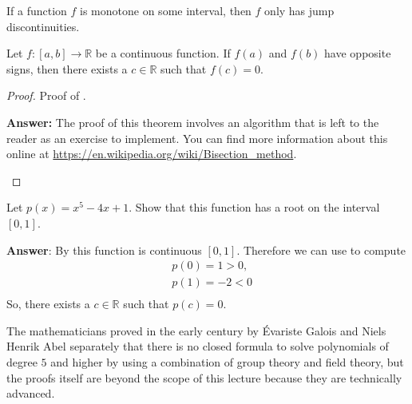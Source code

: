 \begin{thm}\label{thm-monotone-jump-discontinuities}
	If a function $f$ is monotone on some interval, then $f$ only has jump discontinuities.
\end{thm}

\begin{thm}\label{thm-continuous-opposite-signs}
	Let $f:[a,b]\to\mathbb{R}$ be a continuous function. If $f(a)$ and $f(b)$ have
	opposite signs, then there exists a $c\in\mathbb{R}$ such that $f(c)=0$.
\end{thm}

\begin{proof}
	Proof of .
	\begin{flushleft}
		\textbf{Answer:} The proof of this theorem involves an algorithm that is
		left to the reader as an exercise to implement. You can find more information
		about this online at \url{https://en.wikipedia.org/wiki/Bisection_method}.
	\end{flushleft}
\end{proof}

\begin{exm}\label{exm-continuous-opposite-signs:1}
	Let $p(x)=x^5-4x+1$. Show that this function has a root on the interval $[0,1]$.
	\begin{flushleft}
		\textbf{Answer}: By  this
		function is continuous $[0,1]$. Therefore we can use 
		to compute
		\begin{align*}
			 & p(0)=1>0, \\
			 & p(1)=-2<0 \\
		\end{align*}
		So, there exists a $c\in\mathbb{R}$ such that $p(c)=0$.
	\end{flushleft}
\end{exm}

\begin{rem}
	The mathematicians proved in the early  century by \'Evariste Galois
	and Niels Henrik Abel separately that there is no closed formula to solve
	polynomials of degree $5$ and higher by using a combination of group theory
	and field theory, but the proofs itself are beyond the scope of this lecture
	because they are technically advanced.
\end{rem}


